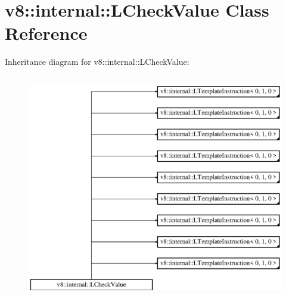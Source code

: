 \hypertarget{classv8_1_1internal_1_1_l_check_value}{}\section{v8\+:\+:internal\+:\+:L\+Check\+Value Class Reference}
\label{classv8_1_1internal_1_1_l_check_value}
Inheritance diagram for v8\+:\+:internal\+:\+:L\+Check\+Value\+:\begin{figure}[H]
\begin{center}
\leavevmode
\includegraphics[height=10.000000cm]{classv8_1_1internal_1_1_l_check_value}
\end{center}
\end{figure}
